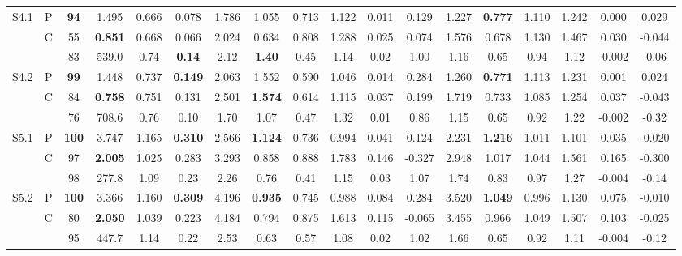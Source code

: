 \begin{table*}[t!]
\begin{adjustbox}{max width=\textwidth}
\begin{tabular}{|c|ccc|cc|cccccc|cccccc|}
\multirow{3}{*}{S4.1} & P & \textbf{94}  & 1.495  & 0.666 & 0.078 & 1.786  & 1.055 & 0.713 & 1.122 & 0.011  & 0.129  & 1.227  & \textbf{0.777} & 1.110 & 1.242 & 0.000 & 0.029  \\
 & C & 55  & \textbf{0.851}  & 0.668 & 0.066 & 2.024  & 0.634 & 0.808 & 1.288 & 0.025  & 0.074  & 1.576  & 0.678 & 1.130 & 1.467  & 0.030  & -0.044 \\
 & \cite{smartinezr2023} & 83 & 539.0  & 0.74 & \textbf{0.14} & 2.12 & \textbf{1.40} & 0.45 & 1.14 & 0.02 & 1.00  & 1.16 & 0.65 & 0.94 & 1.12 & -0.002 & -0.06 \\
\hline 

\multirow{3}{*}{S4.2} & P & \textbf{99}  & 1.448  & 0.737 & \textbf{0.149} & 2.063  & 1.552 & 0.590 & 1.046 & 0.014  & 0.284  & 1.260  & \textbf{0.771} & 1.113 & 1.231 & 0.001 & 0.024  \\
 & C & 84  & \textbf{0.758}  & 0.751 & 0.131 & 2.501  & \textbf{1.574} & 0.614 & 1.115 & 0.037  & 0.199  & 1.719  & 0.733 & 1.085 & 1.254  & 0.037  & -0.043 \\
 & \cite{smartinezr2023} & 76 & 708.6 & 0.76 & 0.10 & 1.70 & 1.07 & 0.47 & 1.32 & 0.01 & 0.86  & 1.15 & 0.65 & 0.92 & 1.22 & -0.002 & -0.32 \\
\hline 

\multirow{3}{*}{S5.1} & P & \textbf{100} & 3.747  & 1.165 & \textbf{0.310} & 2.566  & \textbf{1.124} & 0.736 & 0.994 & 0.041  & 0.124  & 2.231  & \textbf{1.216} & 1.011 & 1.101 & 0.035 & -0.020 \\
 & C & 97  & \textbf{2.005}  & 1.025 & 0.283 & 3.293  & 0.858 & 0.888 & 1.783 & 0.146  & -0.327 & 2.948  & 1.017 & 1.044 & 1.561  & 0.165  & -0.300 \\
 & \cite{smartinezr2023} &  98 & 277.8 & 1.09 & 0.23 & 2.26 & 0.76 & 0.41 & 1.15 & 0.03 & 1.07  & 1.74 & 0.83 & 0.97 & 1.27 & -0.004 & -0.14 \\
\hline 

\multirow{3}{*}{S5.2} & P & \textbf{100} & 3.366  & 1.160 & \textbf{0.309} & 4.196  & \textbf{0.935} & 0.745 & 0.988 & 0.084  & 0.284  & 3.520  & \textbf{1.049} & 0.996 & 1.130 & 0.075 & -0.010 \\
 & C & 80  & \textbf{2.050}  & 1.039 & 0.223 & 4.184  & 0.794 & 0.875 & 1.613 & 0.115  & -0.065 & 3.455  & 0.966 & 1.049 & 1.507  & 0.103  & -0.025 \\
 & \cite{smartinezr2023} &  95 & 447.7  & 1.14 & 0.22 & 2.53 & 0.63 & 0.57 & 1.08 & 0.02 & 1.02  & 1.66 & 0.65 & 0.92 & 1.11 & -0.004 & -0.12\\


\hline 
\end{tabular}
\end{adjustbox}
\vspace*{-2mm}
\end{table*}


